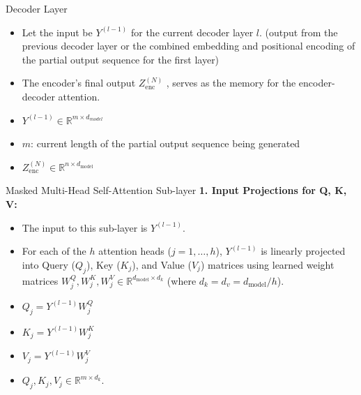 \documentclass{beamer}
\begin{document}
\begin{frame}{Decoder Layer}
  \begin{itemize}
    \item Let the input be $Y^{(l-1)}$ for the current decoder layer $l$. (output from the previous decoder layer 
    or the combined embedding and positional encoding of the partial output sequence for the first layer)
    \item The encoder's final output $ Z_{\text{enc}}^{(N)} $ , serves as the memory for the encoder-decoder attention.
  \end{itemize}

  \begin{itemize}
    \item $Y^{(l-1)} \in \mathbb{R}^{m \times d_{model}}$ 
    \item $m$: current length of the partial output sequence being generated
    \item $ Z_{\text{enc}}^{(N)} \in \mathbb{R}^{n \times d_{\text{model}}} $
  \end{itemize}
  
\end{frame}

\begin{frame}{Masked Multi-Head Self-Attention Sub-layer}
  \textbf{1. Input Projections for Q, K, V:}
  \begin{itemize}
    \item The input to this sub-layer is $Y^{(l-1)}$.
    \item For each of the $h$ attention heads ($j = 1, \dots, h$), $Y^{(l-1)}$ is linearly projected into Query ($Q_j$), Key ($K_j$), and Value ($V_j$) matrices using learned weight matrices $W^Q_j, W^K_j, W^V_j \in \mathbb{R}^{d_{\text{model}} \times d_k}$ (where $d_k = d_v = d_{\text{model}}/h$).
    \item $ Q_j = Y^{(l-1)}W^Q_j $
    \item $ K_j = Y^{(l-1)}W^K_j $
    \item $ V_j = Y^{(l-1)}W^V_j $
    \item $Q_j, K_j, V_j \in \mathbb{R}^{m \times d_k}$.
  \end{itemize}
\end{frame}
\end{document}
